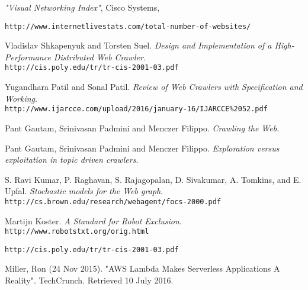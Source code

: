 \begin{thebibliography}{99}

\textit{"Visual Networking Index"}, Cisco Systems, 
  
\texttt{http://www.internetlivestats.com/total-number-of-websites/}

Vladislav Shkapenyuk and Torsten Suel.
\textit{Design and Implementation of a High-Performance Distributed Web Crawler}.\\
\texttt{http://cis.poly.edu/tr/tr-cis-2001-03.pdf}

Yugandhara Patil and Sonal Patil.
\textit{Review of Web Crawlers with Specification and Working}.\\
\texttt{http://www.ijarcce.com/upload/2016/january-16/IJARCCE\%2052.pdf}

Pant Gautam, Srinivasan Padmini and Menczer Filippo.
\textit{Crawling the Web}.\\

Pant Gautam, Srinivasan Padmini and Menczer Filippo.
\textit{Exploration versus exploitation in topic driven crawlers}.\\

S. Ravi Kumar, P. Raghavan, S. Rajagopalan, D. Sivakumar, A. Tomkins, and E. Upfal.
\textit{Stochastic models for the Web graph}.\\
\texttt{http://cs.brown.edu/research/webagent/focs-2000.pdf}

Martijn Koster.
\textit{A Standard for Robot Exclusion}.\\
\texttt{http://www.robotstxt.org/orig.html}
  

\texttt{http://cis.poly.edu/tr/tr-cis-2001-03.pdf}

Miller, Ron (24 Nov 2015). "AWS Lambda Makes Serverless Applications A Reality". TechCrunch. Retrieved 10 July 2016.


\end{thebibliography}
